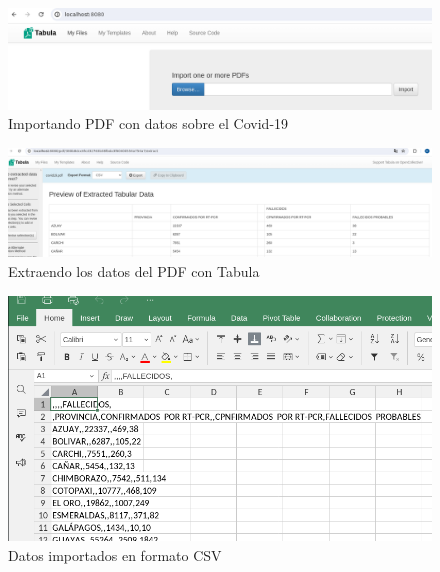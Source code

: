 \documentclass[12pt]{article}
\begin{document}
                        \begin{figure}[!h]
                                \centering
                                \includegraphics[width=1\textwidth]{img/tabula-3.png}
                                \caption{Importando PDF con datos sobre el Covid-19}
                        \end{figure}

                        \newpage
                        \begin{figure}[!h]
                                \centering
                                \includegraphics[width=1\textwidth]{img/tabula-4.png}
                                \caption{Extraendo los datos del PDF con Tabula}
                        \end{figure}

                        \begin{figure}[!h]
                                \centering
                                \includegraphics[width=1\textwidth]{img/tabula-5.png}
                                \caption{Datos importados en formato CSV}
                        \end{figure}
\end{document}

